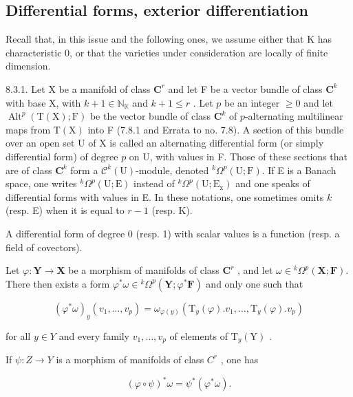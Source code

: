 \subsection{Differential forms, exterior differentiation}

Recall that, in this issue and the following ones, we assume either that K has characteristic 0, or that the varieties under consideration are locally of finite dimension.

8.3.1. Let X be a manifold of class \(\mathbf{C}^r\) and let F be a vector bundle of class \(\mathbf{C}^k\) with base X, with \(k + 1 \in \mathbb{N}_{\mathbb{K}}\) and \(k + 1 \leqslant r\) . Let \(p\) be an integer \(\geqslant 0\) and let \(\operatorname{Alt}^p(\mathrm{T}(\mathrm{X}); \mathrm{F})\) be the vector bundle of class \(\mathbf{C}^k\) of \(p\)-alternating multilinear maps from \(\mathrm{T}(\mathrm{X})\) into F (7.8.1 and Errata to no. 7.8). A section of this bundle over an open set U of X is called an alternating differential form (or simply differential form) of degree \(p\) on U, with values in F. Those of these sections that are of class \(\mathbf{C}^k\) form a \(\mathcal{C}^k(\mathrm{U})\)-module, denoted \(^k\Omega^p(\mathrm{U}; \mathrm{F})\). If E is a Banach space, one writes \(^k\Omega^p(\mathrm{U}; \mathrm{E})\) instead of \(^k\Omega^p(\mathrm{U}; \mathrm{E}_{\mathrm{x}})\) and one speaks of differential forms with values in E. In these notations, one sometimes omits \(k\) (resp. E) when it is equal to \(r - 1\) (resp. K).

A differential form of degree 0 (resp. 1) with scalar values is a function (resp. a field of covectors).

Let \(\varphi\colon\mathbf{Y}\to\mathbf{X}\) be a morphism of manifolds of class \(\mathbf{C}^{r}\) , and let \(\omega\in{}^{k}\Omega^{p}(\mathbf{X};\mathbf{F})\). There then exists a form \(\varphi^{*}\omega\in{}^{k}\Omega^{p}(\mathbf{Y};\varphi^{*}\mathbf{F})\) and only one such that

\[
(\varphi^ {*} \omega) _ {y} (v _ {1}, \dots , v _ {p}) = \omega_ {\varphi (y)} (\mathrm{T} _ {y} (\varphi). v _ {1}, \dots , \mathrm{T} _ {y} (\varphi). v _ {p})\tag{1}
\]

for all \(y \in Y\) and every family \(v_{1}, \ldots, v_{p}\) of elements of \(\mathrm{T}_{y}(\mathrm{Y})\) .

If \(\psi: Z \to Y\) is a morphism of manifolds of class \(C^r\) , one has

\[
(\varphi \circ \psi) ^ {*} \omega = \psi^ {*} (\varphi^ {*} \omega).\tag{2}
\]

